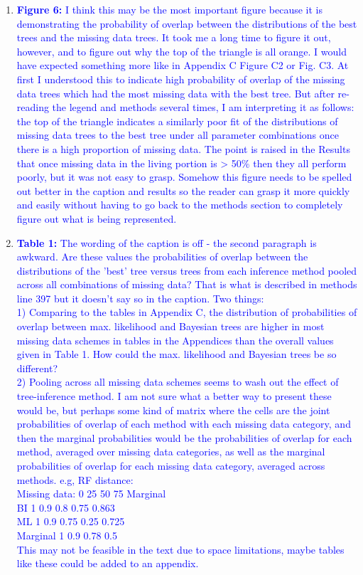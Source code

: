 \documentclass[12pt,letterpaper]{article}
\begin{document}
\begin{enumerate}
\item{\textcolor{blue}{\textbf{Figure 6:} I think this may be the most important figure because it is demonstrating the probability of overlap between the distributions of the best trees and the missing data trees. It took me a long time to figure it out, however, and to figure out why the top of the triangle is all orange. I would have expected something more like in Appendix C Figure C2 or Fig. C3. At first I understood this to indicate high probability of overlap of the missing data trees which had the most missing data with the best tree. But after re-reading the legend and methods several times, I am interpreting it as follows: the top of the triangle indicates a similarly poor fit of the distributions of missing data trees to the best tree under all parameter combinations once there is a high proportion of missing data. The point is raised in the Results that once missing data in the living portion is > 50\% then they all perform poorly, but it was not easy to grasp. Somehow this figure needs to be spelled out better in the caption and results so the reader can grasp it more quickly and easily without having to go back to the methods section to completely figure out what is being represented.}}


\item{\textcolor{blue}{\textbf{Table 1:} The wording of the caption is off - the second paragraph is awkward. 
Are these values the probabilities of overlap between the distributions of the 'best' tree versus trees from each inference method pooled across all combinations of missing data? That is what is described in methods line 397 but it doesn't say so in the caption. Two things:\\
1)  Comparing to the tables in Appendix C, the distribution of probabilities of overlap between max. likelihood and Bayesian trees are higher in most missing data schemes in tables in the Appendices than the overall values given in Table 1. How could the max. likelihood and Bayesian trees be so different?\\
2)  Pooling across all missing data schemes seems to wash out the effect of tree-inference method. I am not sure what a better way to present these would be, but perhaps some kind of matrix where the cells are the joint probabilities of overlap of each method with each missing data category, and then the marginal probabilities would be the probabilities of overlap for each method, averaged over missing data categories, as well as the marginal probabilities of overlap for each missing data category, averaged across methods.  e.g, RF distance:\\
Missing data:   0   25  50  75  Marginal \\
BI  1   0.9 0.8 0.75    0.863 \\
ML  1   0.9 0.75    0.25    0.725 \\
Marginal    1   0.9 0.78    0.5  \\
This may not be feasible in the text due to space limitations, maybe tables like these could be added to an appendix.}}


\end{enumerate}
\end{document}
